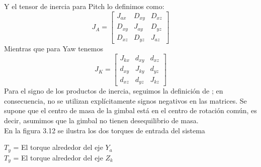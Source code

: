 Y el tensor de inercia para Pitch lo definimos como:
\begin{equation}
	J_A =
	\begin{bmatrix}
		J_{ax} & D_{xy} & D_{xz} \\
		D_{xy} & J_{ay} & D_{yz} \\
		D_{xz} & D_{yz} & J_{az}
	\end{bmatrix}
\end{equation}
Mientras que para Yaw tenemos
\begin{equation}
	J_K =
	\begin{bmatrix}
		J_{kx} & d_{xy} & d_{xz} \\
		d_{xy} & J_{ky} & d_{yz} \\
		d_{xz} & d_{yz} & J_{kz}
	\end{bmatrix}
\end{equation}
Para el signo de los productos de inercia, seguimos la definición de \cite{Book:Goldstein1980}; en consecuencia, no se utilizan explícitamente signos negativos en las matrices.
Se supone que el centro de masa de la gimbal está en el centro de rotación común, es decir, asumimos que la gimbal no tienen desequilibrio de masa.\\
En la figura 3.12 se ilustra los dos torques de entrada del sistema\\
\begin{center}
	$T_y$ = El torque alrededor del eje $Y_a$\\
	$T_y$ = El torque alrededor del eje $Z_k$
\end{center}

